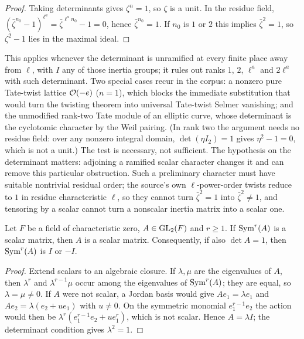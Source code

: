 \begin{proof}
Taking determinants gives $\zeta^n=1$, so $\zeta$ is a unit. In the residue
field,
$(\bar\zeta^{n_0}-1)^{\ell^a}=\bar\zeta^{\ell^an_0}-1=0$, hence
$\bar\zeta^{n_0}=1$. If $n_0$ is $1$ or $2$ this implies $\bar\zeta^2=1$, so
$\zeta^2-1$ lies in the maximal ideal.
\end{proof}

This applies whenever the determinant is unramified at every finite place
away from $\ell$, with $I$ any of those inertia groups; it rules out ranks
$1$, $2$, $\ell^a$ and $2\ell^a$ with such determinant. Two special cases
recur in the corpus: a nonzero pure Tate-twist lattice $\mathcal{O}(-e)$ ($n=1$),
which blocks the immediate substitution that would turn the twisting
theorem into universal Tate-twist Selmer vanishing; and the unmodified
rank-two Tate module of an elliptic curve, whose determinant is the
cyclotomic character by the Weil pairing. (In rank two the argument needs
no residue field: over any nonzero integral domain, $\det(\eta I_2)=1$
gives $\eta^2-1=0$, which is not a unit.) The test is necessary, not
sufficient. The hypothesis on the determinant matters: adjoining a ramified
scalar character changes it and can remove this particular obstruction.
Such a preliminary character must have suitable nontrivial residual order;
the source's own $\ell$-power-order twists reduce to $1$ in residue
characteristic $\ell$, so they cannot turn $\bar\zeta^2=1$ into
$\bar\zeta^2\ne1$, and tensoring by a scalar cannot turn a nonscalar inertia
matrix into a scalar one.

\begin{lemma}\label{sel:lem:symscalar}
Let $F$ be a field of characteristic zero, $A\in\operatorname{GL}_2(F)$ and $r\ge1$. If
$\operatorname{Sym}^r(A)$ is a scalar matrix, then $A$ is a scalar matrix. Consequently,
if also $\det A=1$, then $\operatorname{Sym}^r(A)$ is $I$ or $-I$.
\end{lemma}

\begin{proof}
Extend scalars to an algebraic closure. If $\lambda,\mu$ are the eigenvalues
of $A$, then $\lambda^r$ and $\lambda^{r-1}\mu$ occur among the eigenvalues
of $\operatorname{Sym}^r(A)$; they are equal, so $\lambda=\mu\ne0$. If $A$ were not
scalar, a Jordan basis would give $Ae_1=\lambda e_1$ and
$Ae_2=\lambda(e_2+ue_1)$ with $u\ne0$. On the symmetric monomial
$e_1^{r-1}e_2$ the action would then be
$\lambda^r(e_1^{r-1}e_2+ue_1^r)$, which is not scalar. Hence $A=\lambda I$;
the determinant condition gives $\lambda^2=1$.
\end{proof}

